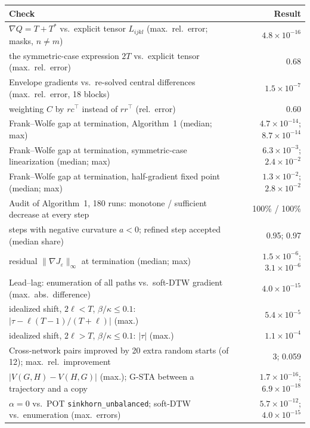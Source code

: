 \begin{tabular}{lr}
\toprule
Check & Result\\
\midrule
$\nabla Q=T+T^\ast$ vs.\ explicit tensor $L_{ijkl}$ (max.\ rel.\ error; masks, $n\ne m$) & $4.8\times10^{-16}$\\
\quad the symmetric-case expression $2T$ vs.\ explicit tensor (max.\ rel.\ error) & 0.68\\
Envelope gradients vs.\ re-solved central differences (max.\ rel.\ error, 18 blocks) & $1.5\times10^{-7}$\\
\quad weighting $C$ by $rc^\top$ instead of $rr^\top$ (rel.\ error) & 0.60\\
Frank--Wolfe gap at termination, Algorithm~1 (median; max) & $4.7\times10^{-14}$; $8.7\times10^{-14}$\\
Frank--Wolfe gap at termination, symmetric-case linearization (median; max) & $6.3\times10^{-3}$; $2.4\times10^{-2}$\\
Frank--Wolfe gap at termination, half-gradient fixed point (median; max) & $1.3\times10^{-2}$; $2.8\times10^{-2}$\\
Audit of Algorithm~1, 180 runs: monotone / sufficient decrease at every step & 100\% / 100\%\\
\quad steps with negative curvature $a<0$; refined step accepted (median share) & 0.95; 0.97\\
\quad residual $\|\nabla J_\varepsilon\|_\infty$ at termination (median; max) & $1.5\times10^{-6}$; $3.1\times10^{-6}$\\
Lead--lag: enumeration of all paths vs.\ soft-DTW gradient (max.\ abs.\ difference) & $4.0\times10^{-15}$\\
\quad idealized shift, $2\ell<T$, $\beta/\kappa\le0.1$: $|\tau-\ell(T-1)/(T+\ell)|$ (max.) & $5.4\times10^{-5}$\\
\quad idealized shift, $2\ell>T$, $\beta/\kappa\le0.1$: $|\tau|$ (max.) & $1.1\times10^{-4}$\\
Cross-network pairs improved by 20 extra random starts (of 12); max.\ rel.\ improvement & 3; 0.059\\
$|V(G,H)-V(H,G)|$ (max.); G-STA between a trajectory and a copy & $1.7\times10^{-16}$; $6.9\times10^{-18}$\\
$\alpha=0$ vs.\ POT \texttt{sinkhorn\_unbalanced}; soft-DTW vs.\ enumeration (max.\ errors) & $5.7\times10^{-12}$; $4.0\times10^{-15}$\\
\bottomrule
\end{tabular}

